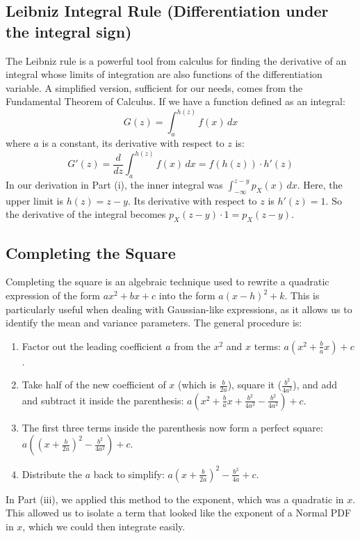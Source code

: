 \documentclass[11pt,a4paper]{article}
\begin{document}
\subsection{Leibniz Integral Rule (Differentiation under the integral sign)} \label{note_leibniz}
The Leibniz rule is a powerful tool from calculus for finding the derivative of an integral whose limits of integration are also functions of the differentiation variable. A simplified version, sufficient for our needs, comes from the Fundamental Theorem of Calculus. If we have a function defined as an integral:
\[ G(z) = \int_a^{h(z)} f(x) \, dx \]
where $a$ is a constant, its derivative with respect to $z$ is:
\[ G'(z) = \frac{d}{dz} \int_a^{h(z)} f(x) \, dx = f(h(z)) \cdot h'(z) \]
In our derivation in Part (i), the inner integral was $ \int_{-\infty}^{z-y} p_X(x) \, dx$. Here, the upper limit is $h(z) = z-y$. Its derivative with respect to $z$ is $h'(z)=1$. So the derivative of the integral becomes $p_X(z-y) \cdot 1 = p_X(z-y)$.

\subsection{Completing the Square} \label{note_square}
Completing the square is an algebraic technique used to rewrite a quadratic expression of the form $ax^2 + bx + c$ into the form $a(x-h)^2 + k$. This is particularly useful when dealing with Gaussian-like expressions, as it allows us to identify the mean and variance parameters. The general procedure is:
\begin{enumerate}
    \item Factor out the leading coefficient $a$ from the $x^2$ and $x$ terms: $a(x^2 + \frac{b}{a}x) + c$.
    \item Take half of the new coefficient of $x$ (which is $\frac{b}{2a}$), square it ($\frac{b^2}{4a^2}$), and add and subtract it inside the parenthesis: $a\left(x^2 + \frac{b}{a}x + \frac{b^2}{4a^2} - \frac{b^2}{4a^2}\right) + c$.
    \item The first three terms inside the parenthesis now form a perfect square: $a\left(\left(x + \frac{b}{2a}\right)^2 - \frac{b^2}{4a^2}\right) + c$.
    \item Distribute the $a$ back to simplify: $a\left(x + \frac{b}{2a}\right)^2 - \frac{b^2}{4a} + c$.
\end{enumerate}
In Part (iii), we applied this method to the exponent, which was a quadratic in $x$. This allowed us to isolate a term that looked like the exponent of a Normal PDF in $x$, which we could then integrate easily.
\end{document}
